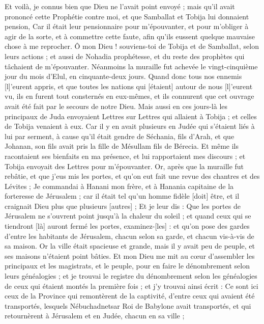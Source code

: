 \begin{multicols}{2}
{Et voilà, je connus bien que Dieu ne l'avait point envoyé ; mais qu'il avait prononcé cette Prophétie contre moi, et que Samballat et Tobija lui donnaient pension,
Car il était leur pensionnaire pour m'épouvanter, et pour m'obliger à agir de la sorte, et à commettre cette faute, afin qu'ils eussent quelque mauvaise chose à me reprocher.
Ô mon Dieu ! souviens-toi de Tobija et de Samballat, selon leurs actions ; et aussi de Nohadia prophétesse, et du reste des prophètes qui tâchaient de m'épouvanter.
Néanmoins la muraille fut achevée le vingt-cinquième jour du mois d'Elul, en cinquante-deux jours.
Quand donc tous nos ennemis [l]'eurent appris, et que toutes les nations qui [étaient] autour de nous [l]'eurent vu, ils en furent tout consternés en eux-mêmes, et ils connurent que cet ouvrage avait été fait par le secours de notre Dieu.
Mais aussi en ces jours-là les principaux de Juda envoyaient Lettres sur Lettres qui allaient à Tobija ; et celles de Tobija venaient à eux.
Car il y en avait plusieurs en Judée qui s'étaient liés à lui par serment, à cause qu'il était gendre de Séchania, fils d'Arah, et que Johanan, son fils avait pris la fille de Mésullam fils de Bérecia.
Et même ils racontaient ses bienfaits en ma présence, et lui rapportaient mes discours ; et Tobija envoyait des Lettres pour m'épouvanter.
\VerseOne{}Or, après que la muraille fut rebâtie, et que j'eus mis les portes, et qu'on eut fait une revue des chantres et des Lévites ;
Je commandai à Hanani mon frère, et à Hanania capitaine de la forteresse de Jérusalem ; car il était tel qu'un homme fidèle [doit] être, et il craignait Dieu plus que plusieurs [autres] ;
Et je leur dis : Que les portes de Jérusalem ne s'ouvrent point jusqu'à la chaleur du soleil ; et quand ceux qui se tiendront [là] auront fermé les portes, examinez-[les] : et qu'on pose des gardes d'entre les habitants de Jérusalem, chacun selon sa garde, et chacun vis-à-vis de sa maison.
Or la ville était spacieuse et grande, mais il y avait peu de peuple, et ses maisons n'étaient point bâties.
Et mon Dieu me mit au cœur d'assembler les principaux et les magistrats, et le peuple, pour en faire le dénombrement selon leurs généalogies ; et je trouvai le registre du dénombrement selon les généalogies de ceux qui étaient montés la première fois ; et j'y trouvai ainsi écrit :
Ce sont ici ceux de la Province qui remontèrent de la captivité, d'entre ceux qui avaient été transportés, lesquels Nébuchadnetsar Roi de Babylone avait transportés, et qui retournèrent à Jérusalem et en Judée, chacun en sa ville ;
}
\end{multicols}
